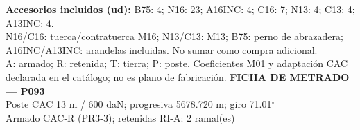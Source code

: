 \begingroup\scriptsize
\textbf{Accesorios incluidos (ud):} B75: 4; N16: 23; A16INC: 4; C16: 7; N13: 4; C13: 4; A13INC: 4.\\
N16/C16: tuerca/contratuerca M16; N13/C13: M13; B75: perno de abrazadera; A16INC/A13INC: arandelas incluidas. No sumar como compra adicional.\\
A: armado; R: retenida; T: tierra; P: poste. Coeficientes M01 y adaptación CAC declarada en el catálogo; no es plano de fabricación.
\endgroup\endgroup
\clearpage{}
\begingroup\small\setlength{\parskip}{3pt}\renewcommand{\arraystretch}{1.05}
\textbf{\large FICHA DE METRADO — P093}\\[4pt]
Poste CAC 13 m / 600 daN; progresiva 5678.720 m; giro 71.01\ensuremath{^\circ}\\
Armado CAC-R (PR3-3); retenidas RI-A: 2 ramal(es)\\
\begingroup\scriptsize
